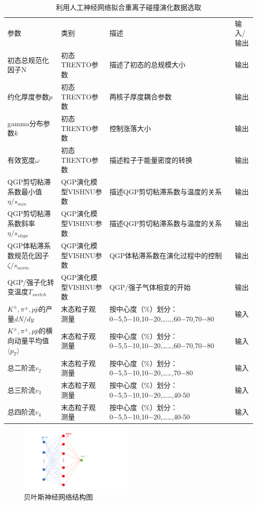 \documentclass[aps,pre,12pt,preprint,onecolumn,showpacs,showkeys]{revtex4-1}
\begin{document}
\begin{table}[htbp]
\caption{利用人工神经网络拟合重离子碰撞演化数据选取\label{tab:bnn}}
\begin{ruledtabular}
\begin{tabular}{p{4cm}p{4cm}p{4cm}p{4cm}}
参数&类别&描述&输入/输出\\
\colrule
初态总规范化因子$\mathrm{N}$&初态TRENTO参数&描述了初态的总规模大小&输出\\
约化厚度参数$p$&初态TRENTO参数&两核子厚度耦合参数&输出\\
gamma分布参数$k$&初态TRENTO参数&控制涨落大小&输出\\
有效宽度$\omega$&初态TRENTO参数&描述粒子于能量密度的转换&输出\\
\colrule
QGP剪切粘滞系数最小值$\eta/s_{min}$&QGP演化模型VISHNU参数&描述QGP剪切粘滞系数与温度的关系&输出\\
QGP剪切粘滞系数斜率$\eta/s_{slope}$&QGP演化模型VISHNU参数&描述QGP剪切粘滞系数与温度的关系&输出\\
QGP体粘滞系数规范化因子$\zeta/s_{norm}$&QGP演化模型VISHNU参数&QGP体粘滞系数在演化过程中的控制&输出\\
QGP/强子化转变温度$T_{switch}$&QGP演化模型VISHNU参数&QGP/强子气体相变的开始&输出\\
\colrule
$K^{\pm},\pi^{\pm},p\bar{p}$的产量$dN/dy$&末态粒子观测量&按中心度（\%）划分：0−5,5−10,10−20,……,60−70,70−80&输入\\
$K^{\pm},\pi^{\pm},p\bar{p}$的横向动量平均值$\langle p_{T}\rangle$&末态粒子观测量&按中心度（\%）划分：0−5,5−10,10−20,……,60−70,70−80&输入\\
总二阶流$v_2$&末态粒子观测量&按中心度（\%）划分：0−5,5−10,10−20,……,70−80&输入\\
总三阶流$v_3$&末态粒子观测量&按中心度（\%）划分：0−5,5−10,10−20,……,40-50&输入\\
总四阶流$v_4$&末态粒子观测量&按中心度（\%）划分：0−5,5−10,10−20,……,40-50&输入\\
\end{tabular}
\end{ruledtabular}
\end{table}
\begin{figure}[t]
\centering
\includegraphics[width=0.5\textwidth]{bnn}
\caption{贝叶斯神经网络结构图\label{fig:bnn}}%
\end{figure}
\end{document}
